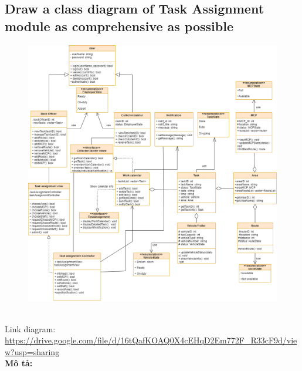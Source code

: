 \documentclass[a4paper]{article}
\begin{document}
\subsection{Draw a class diagram of Task Assignment module as comprehensive as possible}
\newpage
\begin{figure}[!h]
    \begin{center}
      \includegraphics[width=6in]{Image/TaskAssignmentClass.drawio.png}
    \end{center}
\end{figure} 
\\
Link diagram: \url{https://drive.google.com/file/d/16tQafKOAQ0X4cEHqD2Em772F_R33cF9d/view?usp=sharing}
\\
\newpage
\textbf{Mô tả:}
\end{document}
